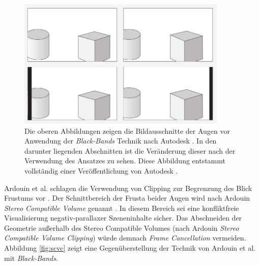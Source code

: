 \begin{figure}
	\begin{center}
		\includegraphics[width=10cm]{img/black_bands.pdf}
	\end{center}
	\caption{Die oberen Abbildungen zeigen die Bildausschnitte der Augen vor Anwendung der \emph{Black-Bands} Technik nach Autodesk \cite{autodesk:2008}. In den darunter liegenden Abschnitten ist die Veränderung dieser nach der Verwendung des Ansatzes zu sehen. Diese Abbildung entstammt vollständig einer Veröffentlichung von Autodesk \cite{autodesk:2008}.}
	\label{fig:black_bands}
\end{figure}

Ardouin et al. schlagen die Verwendung von Clipping zur Begrenzung des Blick Frustums vor \cite{ardouin:2011}. Der Schnittbereich der Frusta beider Augen wird nach Ardouin \emph{Stereo Compatible Volume} genannt \linebreak \cite{ardouin:2011}. In diesem Bereich sei eine konfliktfreie Visualisierung negativ-parallaxer Szeneninhalte sicher. Das Abschneiden der Geometrie außerhalb des Stereo Compatible Volumes (nach Ardouin \emph{Stereo Compatible Volume Clipping}) würde demnach \emph{Frame Cancellation} vermeiden. Abbildung \ref{fig:scvc} zeigt eine Gegenüberstellung der Technik von Ardouin et al. mit \emph{Black-Bands}.

